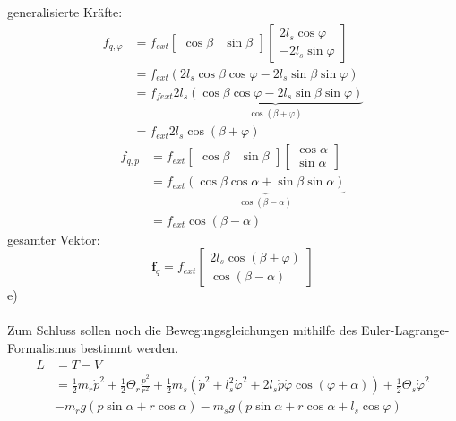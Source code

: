 	generalisierte Kräfte:
	\begin{align*}
		f_{q,\varphi} &= f_{ext}\left[\begin{matrix}
		\cos\beta & \sin\beta
		\end{matrix}\right] \left[\begin{matrix}
		2l_s\cos\varphi \\
		-2l_s\sin\varphi
		\end{matrix}\right] \\
		&= f_{ext} \left(2l_s\cos\beta\cos\varphi - 2l_s\sin\beta\sin\varphi\right) \\
		&= f_{fext}2l_s \underbrace{\left(\cos\beta\cos\varphi - 2l_s\sin\beta\sin\varphi\right)}_{\cos\left(\beta + \varphi\right)} \\
		&= f_{ext}2l_s\cos\left(\beta + \varphi\right)
	\end{align*}
	\begin{align*}
		f_{q,p} &= f_{ext} \left[\begin{matrix}
		\cos\beta & \sin\beta
		\end{matrix}\right] \left[\begin{matrix}
			\cos\alpha \\
			\sin\alpha
		\end{matrix}\right] \\
		&= f_{ext} \underbrace{\left(\cos\beta\cos\alpha + \sin\beta\sin\alpha\right)}_{\cos\left(\beta - \alpha\right)} \\
		&= f_{ext} \cos\left(\beta - \alpha\right)
	\end{align*}
	gesamter Vektor:
	\[
		\textbf{f}_q = f_{ext} \left[\begin{matrix}
			2l_s\cos\left(\beta + \varphi\right) \\
			\cos\left(\beta - \alpha\right)
		\end{matrix}\right]
	\]
	\newpage
	\noindent
	e) \\ \\
	Zum Schluss sollen noch die Bewegungsgleichungen mithilfe des Euler-Lagrange-Formalismus bestimmt werden.
	\begin{align*}
		L &= T - V \\
		 &= \frac{1}{2}m_r\dot{p}^2 + \frac{1}{2} \Theta_r \frac{\dot{p}^2}{r^2} + \frac{1}{2}m_s\left(\dot{p}^2 + l_s^2\dot{\varphi}^2 + 2l_s\dot{p}\dot{\varphi}\cos\left(\varphi + \alpha\right)\right) + \frac{1}{2} \Theta_s \dot{\varphi}^2 \\
		 & - m_rg\left(p\sin\alpha + r\cos\alpha\right) - m_sg\left(p\sin\alpha + r\cos\alpha + l_s\cos\varphi\right)
	\end{align*}
